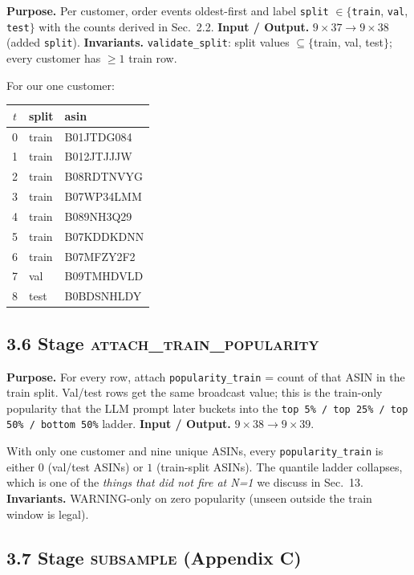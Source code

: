 \documentclass[11pt,a4paper]{article}
\begin{document}
\textbf{Purpose.} Per customer, order events oldest-first and label
\texttt{split} $\in \{$\texttt{train}, \texttt{val}, \texttt{test}$\}$
with the counts derived in Sec.~2.2.
\textbf{Input / Output.} $9 \times 37 \to 9 \times 38$ (added
\texttt{split}).
\textbf{Invariants.} \texttt{validate\_split}: split values
$\subseteq \{$train, val, test$\}$; every customer has $\geq 1$ train
row.

For our one customer:
\begin{center}\small
\begin{tabular}{c l l}\toprule
$t$ & split & asin \\ \midrule
0 & train & B01JTDG084 \\
1 & train & B012JTJJJW \\
2 & train & B08RDTNVYG \\
3 & train & B07WP34LMM \\
4 & train & B089NH3Q29 \\
5 & train & B07KDDKDNN \\
6 & train & B07MFZY2F2 \\
7 & val   & B09TMHDVLD \\
8 & test  & B0BDSNHLDY \\
\bottomrule
\end{tabular}\end{center}

\subsection*{3.6 Stage \textsc{attach\_train\_popularity}}

\textbf{Purpose.} For every row, attach \texttt{popularity\_train} =
count of that ASIN in the train split. Val/test rows get the same
broadcast value; this is the train-only popularity that the LLM prompt
later buckets into the
\texttt{top 5\% / top 25\% / top 50\% / bottom 50\%} ladder.
\textbf{Input / Output.} $9 \times 38 \to 9 \times 39$.

With only one customer and nine unique ASINs, every
\texttt{popularity\_train} is either $0$ (val/test ASINs) or $1$
(train-split ASINs). The quantile ladder collapses, which is one of
the \emph{things that did not fire at N=1} we discuss in Sec.~13.
\textbf{Invariants.} WARNING-only on zero popularity (unseen outside
the train window is legal).

\subsection*{3.7 Stage \textsc{subsample} (Appendix C)}
\end{document}
